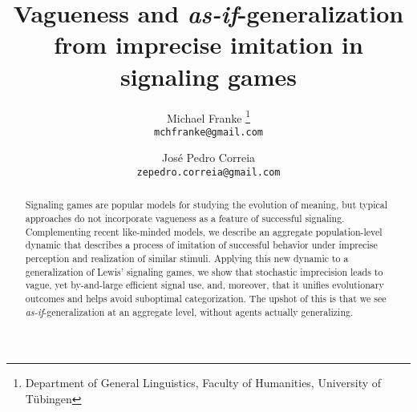 \documentclass{article}
\title{Vagueness and \emph{as-if}-generalization from imprecise imitation in signaling games}
\author{
Michael Franke%
\thanks{Department of General Linguistics, Faculty of Humanities, University of Tübingen}\\
\texttt{mchfranke@gmail.com}
\and
Jos\'e Pedro Correia\\
\texttt{zepedro.correia@gmail.com}
}
\date{}
\begin{document}
\maketitle

\begin{abstract}
  Signaling games are popular models for studying the evolution of meaning, but typical
  approaches do not incorporate vagueness as a feature of successful signaling.  Complementing
  recent like-minded models, we describe an aggregate population-level dynamic that describes a
  process of imitation of successful behavior under imprecise perception and realization of
  similar stimuli. Applying this new dynamic to a generalization of Lewis' signaling games, we
  show that stochastic imprecision leads to vague, yet by-and-large efficient signal use, and,
  moreover, that it unifies evolutionary outcomes and helps avoid suboptimal
  categorization. The upshot of this is that we see \emph{as-if}-generalization at an aggregate
  level, without agents actually generalizing.
\end{abstract}
\end{document}
